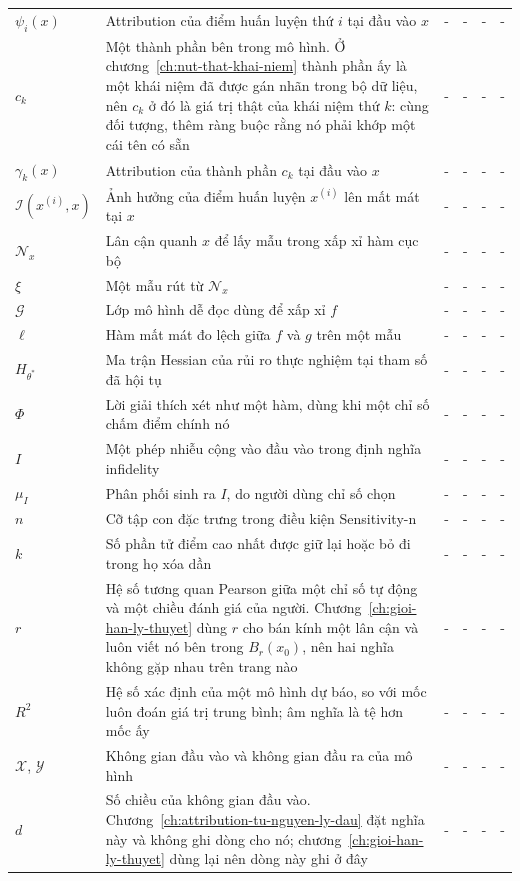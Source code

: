 \begin{longtable}{@{}lp{\kyhieuw}p{\kyhieuwmap}p{\kyhieuwmap}p{\kyhieuwmap}p{\kyhieuwlast}@{}}
$\psi_i(x)$ & Attribution của điểm huấn luyện thứ $i$ tại đầu vào $x$ & - & - & - & - \\
$c_k$ & Một thành phần bên trong mô hình. Ở chương~\ref{ch:nut-that-khai-niem} thành phần ấy là một khái niệm đã được gán nhãn trong bộ dữ liệu, nên $c_k$ ở đó là giá trị thật của khái niệm thứ $k$: cùng đối tượng, thêm ràng buộc rằng nó phải khớp một cái tên có sẵn & - & - & - & - \\
$\gamma_k(x)$ & Attribution của thành phần $c_k$ tại đầu vào $x$ & - & - & - & - \\
$\mathcal{I}(x^{(i)},x)$ & Ảnh hưởng của điểm huấn luyện $x^{(i)}$ lên mất mát tại $x$ & - & - & - & - \\
$\mathcal{N}_x$ & Lân cận quanh $x$ để lấy mẫu trong xấp xỉ hàm cục bộ & - & - & - & - \\
$\xi$ & Một mẫu rút từ $\mathcal{N}_x$ & - & - & - & - \\
$\mathcal{G}$ & Lớp mô hình dễ đọc dùng để xấp xỉ $f$ & - & - & - & - \\
$\ell$ & Hàm mất mát đo lệch giữa $f$ và $g$ trên một mẫu & - & - & - & - \\
$H_{\theta^{*}}$ & Ma trận Hessian của rủi ro thực nghiệm tại tham số đã hội tụ & - & - & - & - \\
$\Phi$ & Lời giải thích xét như một hàm, dùng khi một chỉ số chấm điểm chính nó & - & - & - & - \\
$I$ & Một phép nhiễu cộng vào đầu vào trong định nghĩa infidelity & - & - & - & - \\
$\mu_I$ & Phân phối sinh ra $I$, do người dùng chỉ số chọn & - & - & - & - \\
$n$ & Cỡ tập con đặc trưng trong điều kiện Sensitivity-n & - & - & - & - \\
$k$ & Số phần tử điểm cao nhất được giữ lại hoặc bỏ đi trong họ xóa dần & - & - & - & - \\
$r$ & Hệ số tương quan Pearson giữa một chỉ số tự động và một chiều đánh giá của người. Chương~\ref{ch:gioi-han-ly-thuyet} dùng $r$ cho bán kính một lân cận và luôn viết nó bên trong $B_r(x_0)$, nên hai nghĩa không gặp nhau trên trang nào & - & - & - & - \\
$R^2$ & Hệ số xác định của một mô hình dự báo, so với mốc luôn đoán giá trị trung bình; âm nghĩa là tệ hơn mốc ấy & - & - & - & - \\
$\mathcal{X}$, $\mathcal{Y}$ & Không gian đầu vào và không gian đầu ra của mô hình & - & - & - & - \\
$d$ & Số chiều của không gian đầu vào. Chương~\ref{ch:attribution-tu-nguyen-ly-dau} đặt nghĩa này và không ghi dòng cho nó; chương~\ref{ch:gioi-han-ly-thuyet} dùng lại nên dòng này ghi ở đây & - & - & - & - \\

\end{longtable}
